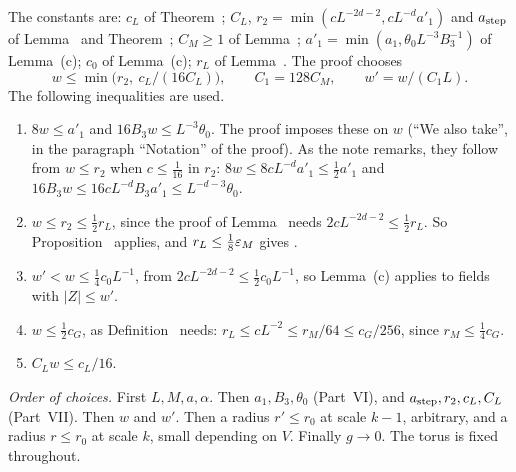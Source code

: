 \begin{detail}\label{d11a:A14a}
The constants are: $c_L$ of Theorem~; $C_L$, $r_2=\min(cL^{-2d-2},cL^{-d}a'_1)$ and $a_{\rm step}$ of Lemma~ and Theorem~; $C_M\ge1$ of Lemma~; $a'_1=\min(a_1,\theta_0L^{-3}B_3^{-1})$ of Lemma~(c); $c_0$ of Lemma~(c); $r_L$ of Lemma~. The proof chooses
\[
w\le\min\big(r_2,\ c_L/(16C_L)\big),\qquad C_1=128C_M,\qquad w'=w/(C_1L).
\]
The following inequalities are used.
\begin{enumerate}[label=(w\arabic*)]
\item $8w\le a'_1$ and $16B_3w\le L^{-3}\theta_0$. The proof imposes these on $w$ (``We also take'', in the paragraph ``Notation'' of the proof). As the note remarks, they follow from $w\le r_2$ when $c\le\frac1{16}$ in $r_2$: $8w\le8cL^{-d}a'_1\le\frac12a'_1$ and $16B_3w\le16cL^{-d}B_3a'_1\le L^{-d-3}\theta_0$.
\item $w\le r_2\le\frac12r_L$, since the proof of Lemma~ needs $2cL^{-2d-2}\le\frac12r_L$. So Proposition~ applies, and $r_L\le\frac18\varepsilon_M$ gives .
\item $w'<w\le\frac14c_0L^{-1}$, from $2cL^{-2d-2}\le\frac12c_0L^{-1}$, so Lemma~(c) applies to fields with $|Z|\le w'$.
\item $w\le\frac12c_G$, as Definition~ needs: $r_L\le cL^{-2}\le r_M/64\le c_G/256$, since $r_M\le\frac14c_G$.
\item $C_Lw\le c_L/16$.
\end{enumerate}
\emph{Order of choices.} First $L,M,a,\alpha$. Then $a_1,B_3,\theta_0$ (Part~VI), and $a_{\rm step},r_2,c_L,C_L$ (Part~VII). Then $w$ and $w'$. Then a radius $r'\le r_0$ at scale $k-1$, arbitrary, and a radius $r\le r_0$ at scale $k$, small depending on $V$. Finally $g\to0$. The torus is fixed throughout.
\end{detail}

